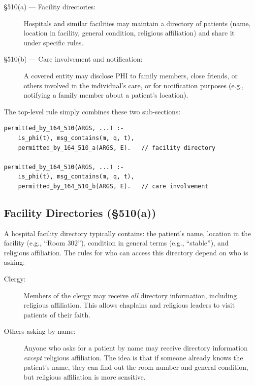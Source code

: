 \documentclass[11pt,letterpaper]{article}
\begin{document}
\begin{description}
  \item[\S 510(a) --- Facility directories:] Hospitals and similar facilities may maintain a directory of patients (name, location in facility, general condition, religious affiliation) and share it under specific rules.
  \item[\S 510(b) --- Care involvement and notification:] A covered entity may disclose PHI to family members, close friends, or others involved in the individual's care, or for notification purposes (e.g., notifying a family member about a patient's location).
\end{description}

The top-level rule simply combines these two sub-sections:

\begin{lstlisting}[style=soufflestyle,caption={Top-level \S 510 (from hipaa\_164\_510.dl)}]
permitted_by_164_510(ARGS, ...) :-
    is_phi(t), msg_contains(m, q, t),
    permitted_by_164_510_a(ARGS, E).   // facility directory

permitted_by_164_510(ARGS, ...) :-
    is_phi(t), msg_contains(m, q, t),
    permitted_by_164_510_b(ARGS, E).   // care involvement
\end{lstlisting}

\subsection{Facility Directories (\S 510(a))}

A hospital facility directory typically contains: the patient's name, location in the facility (e.g., ``Room 302''), condition in general terms (e.g., ``stable''), and religious affiliation. The rules for who can access this directory depend on who is asking:

\begin{description}
  \item[Clergy:] Members of the clergy may receive \emph{all} directory information, including religious affiliation. This allows chaplains and religious leaders to visit patients of their faith.
  \item[Others asking by name:] Anyone who asks for a patient by name may receive directory information \emph{except} religious affiliation. The idea is that if someone already knows the patient's name, they can find out the room number and general condition, but religious affiliation is more sensitive.
\end{description}
\end{document}
